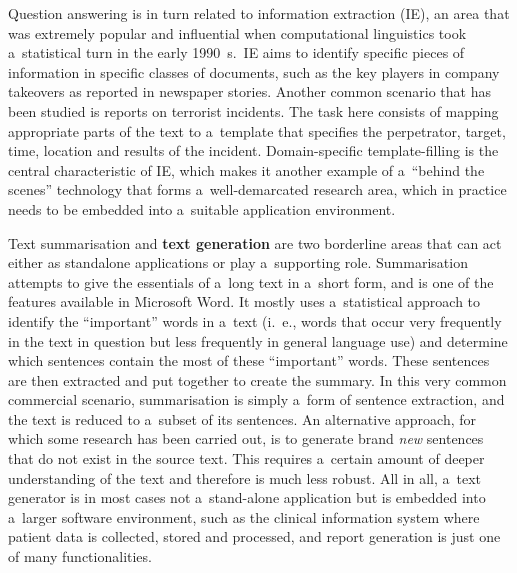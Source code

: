 \begin{multicols}{2}
Question answering is in turn related to information extraction (IE),
an area that was extremely popular and influential when computational
linguistics took a~statistical turn in the early 1990~s.~IE aims to
identify specific pieces of information in specific classes of
documents, such as the key players in company takeovers as reported in
newspaper stories. Another common scenario that has been studied is
reports on terrorist incidents. The task here consists of mapping
appropriate parts of the text to a~template that specifies the
perpetrator, target, time, location and results of the incident.
Domain-specific template-filling is the central characteristic of IE,
which makes it another example of a~“behind the scenes” technology
that forms a~well-demarcated research area, which in practice needs to
be embedded into a~suitable application environment. 


Text summarisation and \textbf{text generation} are two borderline
areas that can act either as standalone applications or play
a~supporting role. Summarisation attempts to give the essentials of
a~long text in a~short form, and is one of the features available in
Microsoft Word. It mostly uses a~statistical approach to identify the
“important” words in a~text (i.\, e., words that occur very
frequently in the text in question but less frequently in general
language use) and determine which sentences contain the most of these
“important” words. These sentences are then extracted and put
together to create the summary. In this very common commercial
scenario, summarisation is simply a~form of sentence extraction, and
the text is reduced to a~subset of its sentences. An alternative
approach, for which some research has been carried out, is to generate
brand \emph{new} sentences that do not exist in the source text. This
requires a~certain amount of deeper understanding of the text and
therefore is much less robust. All in all, a~text generator is in most
cases not a~stand-alone application but is embedded into a~larger
software environment, such as the clinical information system where
patient data is collected, stored and processed, and report generation
is just one of many functionalities. 



\end{multicols}
